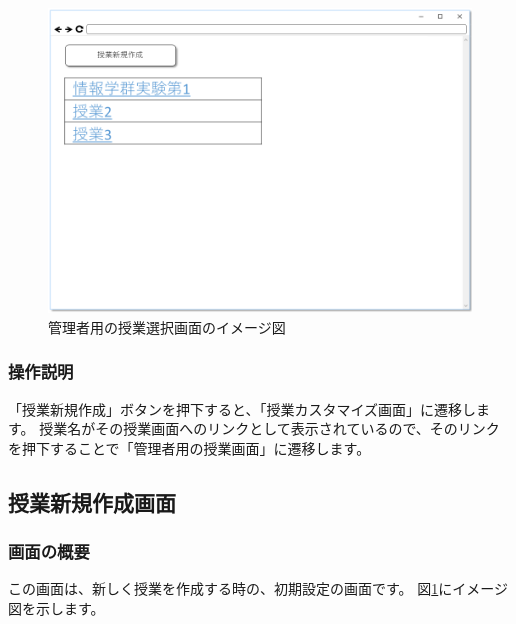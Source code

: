 \begin{figure}[htbp]
  \begin{center}
    \includegraphics[width=1\linewidth,clip]{./img/sc_select_class.png}
    \caption{管理者用の授業選択画面のイメージ図}\label{fig:sc_select_class}
  \end{center}
\end{figure}

\subsubsection{操作説明}
「授業新規作成」ボタンを押下すると、「授業カスタマイズ画面」に遷移します。
授業名がその授業画面へのリンクとして表示されているので、そのリンクを押下することで「管理者用の授業画面」に遷移します。

\newpage

\subsection{授業新規作成画面}
\subsubsection{画面の概要}
この画面は、新しく授業を作成する時の、初期設定の画面です。
図\ref{fig:sc_select_class}にイメージ図を示します。

